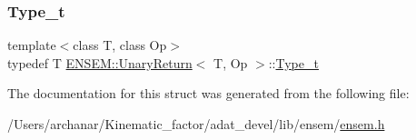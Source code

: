 \subsubsection{\texorpdfstring{Type\_t}{Type\_t}\hspace{0.1cm}{\footnotesize\ttfamily [2/2]}}
{\footnotesize\ttfamily template$<$class T, class Op$>$ \\
typedef T \mbox{\hyperlink{structENSEM_1_1UnaryReturn}{E\+N\+S\+E\+M\+::\+Unary\+Return}}$<$ T, Op $>$\+::\mbox{\hyperlink{structENSEM_1_1UnaryReturn_a16a257c6ea03664cc3e42cbfe2ca219d}{Type\+\_\+t}}}



The documentation for this struct was generated from the following file\+:\begin{DoxyCompactItemize}
\item 
/\+Users/archanar/\+Kinematic\+\_\+factor/adat\+\_\+devel/lib/ensem/\mbox{\hyperlink{lib_2ensem_2ensem_8h}{ensem.\+h}}\end{DoxyCompactItemize}
